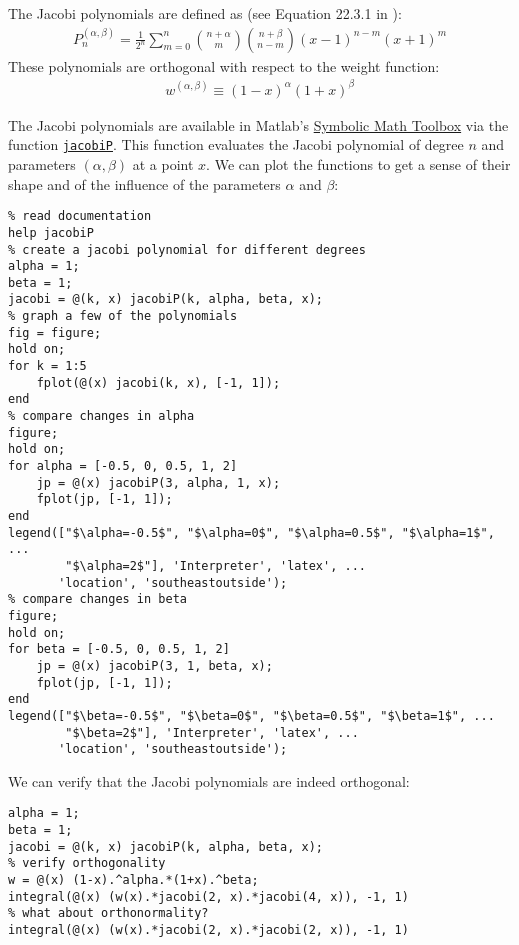 \documentclass[12pt, a4paper]{article}
\begin{document}
The Jacobi polynomials are defined as (see Equation 22.3.1 in \citet{AS1964}):
\begin{align*}
P_n^{(\alpha, \beta)}=\frac{1}{2^n}\sum_{m=0}^n\binom{n+\alpha}{m}\binom{n+\beta}{n-m}(x-1)^{n-m}(x+1)^m
\end{align*}
These polynomials are orthogonal with respect to the weight function:
\begin{align*}
w^{(\alpha, \beta)}\equiv (1-x)^{\alpha}(1+x)^{\beta}
\end{align*}

The Jacobi polynomials are available in Matlab's \href{https://www.mathworks.com/help/symbolic/index.html?s\_tid=CRUX\_lftnav}{Symbolic Math Toolbox} via the function \href{https://www.mathworks.com/help/symbolic/jacobip.html}{\texttt{jacobiP}}.
This function evaluates the Jacobi polynomial of degree \(n\) and parameters \((\alpha, \beta)\) at a point \(x\).
We can plot the functions to get a sense of their shape and of the influence of the parameters \(\alpha\) and \(\beta\):
\lstset{language=matlab,label= ,caption= ,captionpos=b,firstnumber=1,numbers=left,style=Matlab-editor}
\begin{lstlisting}
% read documentation
help jacobiP
% create a jacobi polynomial for different degrees
alpha = 1;
beta = 1;
jacobi = @(k, x) jacobiP(k, alpha, beta, x);
% graph a few of the polynomials
fig = figure;
hold on;
for k = 1:5
    fplot(@(x) jacobi(k, x), [-1, 1]);
end
% compare changes in alpha
figure;
hold on;
for alpha = [-0.5, 0, 0.5, 1, 2]
    jp = @(x) jacobiP(3, alpha, 1, x);
    fplot(jp, [-1, 1]);
end
legend(["$\alpha=-0.5$", "$\alpha=0$", "$\alpha=0.5$", "$\alpha=1$", ...
        "$\alpha=2$"], 'Interpreter', 'latex', ...
       'location', 'southeastoutside');
% compare changes in beta
figure;
hold on;
for beta = [-0.5, 0, 0.5, 1, 2]
    jp = @(x) jacobiP(3, 1, beta, x);
    fplot(jp, [-1, 1]);
end
legend(["$\beta=-0.5$", "$\beta=0$", "$\beta=0.5$", "$\beta=1$", ...
        "$\beta=2$"], 'Interpreter', 'latex', ...
       'location', 'southeastoutside');
\end{lstlisting}
We can verify that the Jacobi polynomials are indeed orthogonal:
\lstset{language=matlab,label= ,caption= ,captionpos=b,firstnumber=1,numbers=left,style=Matlab-editor}
\begin{lstlisting}
alpha = 1;
beta = 1;
jacobi = @(k, x) jacobiP(k, alpha, beta, x);
% verify orthogonality
w = @(x) (1-x).^alpha.*(1+x).^beta;
integral(@(x) (w(x).*jacobi(2, x).*jacobi(4, x)), -1, 1)
% what about orthonormality?
integral(@(x) (w(x).*jacobi(2, x).*jacobi(2, x)), -1, 1)
\end{lstlisting}
\end{document}
